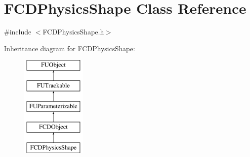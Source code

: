 \hypertarget{classFCDPhysicsShape}{
\section{FCDPhysicsShape Class Reference}
\label{classFCDPhysicsShape}
}


{\ttfamily \#include $<$FCDPhysicsShape.h$>$}

Inheritance diagram for FCDPhysicsShape:\begin{figure}[H]
\begin{center}
\leavevmode
\includegraphics[height=5.000000cm]{classFCDPhysicsShape}
\end{center}
\end{figure}

